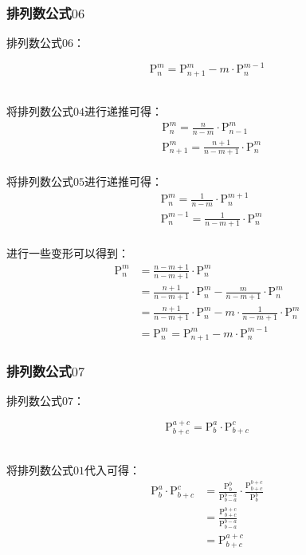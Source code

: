 \documentclass[UTF8]{ctexart}
\begin{document}
\subsubsection{排列数公式$06$}
    排列数公式$06$：
    \begin{large}
        \begin{equation*}
            \mathrm{P}_n^m=\mathrm{P}_{n+1}^m-m\cdot\mathrm{P}_n^{m-1}
        \end{equation*}
    \end{large}\\
    将排列数公式$04$进行递推可得：
    \setcounter{equation}{0}
    \begin{align}
        &\mathrm{P}_n^m=\frac{n}{n-m}\cdot\mathrm{P}_{n-1}^{m}\\[3mm]
        &\mathrm{P}_{n+1}^m=\frac{n+1}{n-m+1}\cdot\mathrm{P}_{n}^{m}
    \end{align}\\
    将排列数公式$05$进行递推可得：
    \begin{align}
        &\mathrm{P}_n^m=\frac{1}{n-m}\cdot\mathrm{P}_{n}^{m+1}\\[3mm]
        &\mathrm{P}_n^{m-1}=\frac{1}{n-m+1}\cdot\mathrm{P}_{n}^{m}
    \end{align}\\
    进行一些变形可以得到：
    \begin{align}
        \mathrm{P}_n^m
        &=\frac{n-m+1}{n-m+1}\cdot\mathrm{P}_n^m\\[3mm]
        &=\frac{n+1}{n-m+1}\cdot\mathrm{P}_n^m-\frac{m}{n-m+1}\cdot\mathrm{P}_n^m\\[3mm]
        &=\frac{n+1}{n-m+1}\cdot\mathrm{P}_n^m-m\cdot\frac{1}{n-m+1}\cdot\mathrm{P}_n^m\\[3mm]
        &=\mathrm{P}_n^m=\mathrm{P}_{n+1}^m-m\cdot\mathrm{P}_n^{m-1}
    \end{align}\vspace{5pt}

\subsubsection{排列数公式$07$}
    排列数公式$07$：
    \begin{large}
        \begin{equation*}
            \mathrm{P}_{b+c}^{a+c}=\mathrm{P}_b^a\cdot\mathrm{P}_{b+c}^c
        \end{equation*}
    \end{large}\\
    将排列数公式$01$代入可得：
    \setcounter{equation}{0}
    \begin{align}
        \mathrm{P}_b^a\cdot\mathrm{P}_{b+c}^c
        &=\frac{\mathrm{P}_b^b}{\mathrm{P}_{b-a}^{b-a}}\cdot\frac{\mathrm{P}_{b+c}^{b+c}}{\mathrm{P}_b^b}\\[3mm]
        &=\frac{\mathrm{P}_{b+c}^{b+c}}{\mathrm{P}_{b-a}^{b-a}}\\[3mm]
        &=\mathrm{P}_{b+c}^{a+c}
    \end{align}
\end{document}
